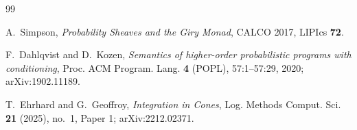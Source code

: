 \begin{thebibliography}{99}

A.~Simpson,
\textit{Probability Sheaves and the Giry Monad},
CALCO 2017, LIPIcs \textbf{72}.

F.~Dahlqvist and D.~Kozen,
\textit{Semantics of higher-order probabilistic programs with conditioning},
Proc. ACM Program. Lang. \textbf{4} (POPL), 57:1--57:29, 2020; arXiv:1902.11189.

T.~Ehrhard and G.~Geoffroy,
\textit{Integration in Cones},
Log. Methods Comput. Sci. \textbf{21} (2025), no.~1, Paper 1; arXiv:2212.02371.

\end{thebibliography}
